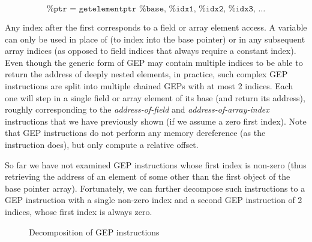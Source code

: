 \[
  \texttt{
  }
  \ldots
\]

Any index after the first corresponds to a field or array element
access. A variable can only be used in place of  (to
index into the base pointer) or in any subsequent array indices (as
opposed to field indices that always require a constant index). Even
though the generic form of GEP may contain multiple indices to be able
to return the address of deeply nested elements, in practice, such
complex GEP instructions are split into multiple chained GEPs with at
most 2 indices. Each one will step in a single field or array element
of its base (and return its address), roughly corresponding to the
\emph{address-of-field} and \emph{address-of-array-index} instructions
that we have previously shown (if we assume a zero first index). Note
that GEP instructions do not perform any memory dereference (as the
instruction  does), but only compute a relative offset.

So far we have not examined GEP instructions whose first index is
non-zero (thus retrieving the address of an element of some other than
the first object of the base pointer array). Fortunately, we can
further decompose such instructions to a GEP instruction with a single
non-zero index and a second GEP instruction of 2 indices, whose first
index is always zero.

\begin{figure}[h!t]
  \begin{minipage}[b]{.5\linewidth}
    \centering\large
    \begin{bitcode}
    \end{bitcode}
    \label{structsens/fig/gep1}
  \end{minipage}%
  \begin{minipage}[b]{.5\linewidth}
    \centering\large
    \begin{bitcode}
    \end{bitcode}
    \label{structsens/fig/gep2}\par\vfill
  \end{minipage}
  \caption{Decomposition of GEP instructions}
  \label{structsens/fig/gep}
\end{figure}


